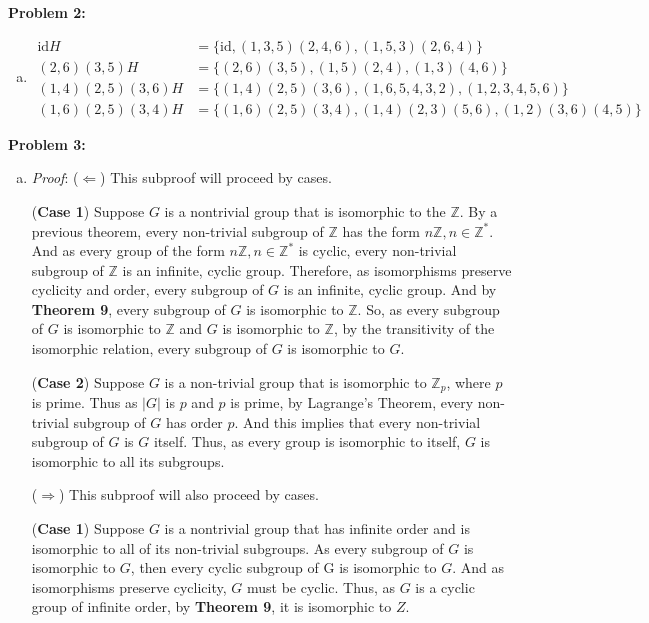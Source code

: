\documentclass[12pt, letterpaper]{article}
\newenvironment{problem}
    [1]
    {\noindent \textbf{Problem #1:}}
    {\vspace{3mm}}
\begin{document}
\begin{problem}{2}
\begin{enumerate}[(a)]
        \item \begin{align*}
            \text{id}H &= \{\text{id}, (1,3,5)(2,4,6), (1,5,3)(2,6,4)\}\\
            (2,6)(3,5)H &= \{(2,6)(3,5), (1,5)(2,4), (1,3)(4,6)\}\\
            (1,4)(2,5)(3,6)H &= \{(1,4)(2,5)(3,6), (1,6,5,4,3,2), (1,2,3,4,5,6)\}\\ 
            (1,6)(2,5)(3,4)H &= \{(1,6)(2,5)(3,4), (1,4)(2,3)(5,6), (1,2)(3,6)(4,5)\}
        \end{align*}
    \end{enumerate}
\end{problem}

\begin{problem}{3}
    \begin{enumerate}[(a)]
        \item \emph{Proof}: ($\Leftarrow$) This subproof will proceed by cases.
        
        \bigskip\noindent
        (\textbf{Case 1}) Suppose
        $G$ is a nontrivial group that is isomorphic to the $\mathbb{Z}$. By a previous theorem,
        every non-trivial subgroup of $\mathbb{Z}$ has the form $n\mathbb{Z}, n \in \mathbb{Z}^*$.
        And as every group of the form $n\mathbb{Z}, n \in \mathbb{Z}^*$ is cyclic, every non-trivial
        subgroup of $\mathbb{Z}$ is an infinite, cyclic group. Therefore, as isomorphisms preserve 
        cyclicity and order, every subgroup of $G$ is an infinite, cyclic group. And by 
        \textbf{Theorem 9}, every subgroup of $G$ is isomorphic to $\mathbb{Z}$. So, as
        every subgroup of $G$ is isomorphic to $\mathbb{Z}$ and $G$ is isomorphic to $\mathbb{Z}$,
        by the transitivity of the isomorphic relation, every subgroup of $G$ is isomorphic to $G$.

        \bigskip\noindent
        (\textbf{Case 2})
        Suppose $G$ is a non-trivial group that is isomorphic to $\mathbb{Z}_p$, where $p$ is prime.
        Thus as $|G|$ is $p$ and $p$ is prime, by Lagrange's Theorem, every non-trivial subgroup of 
        $G$ has order $p$. And this implies that every non-trivial subgroup of $G$ is $G$ itself.
        Thus, as every group is isomorphic to itself, $G$ is isomorphic to all its subgroups. 

        \bigskip\noindent
        ($\Rightarrow$) This subproof will also proceed by cases.

        \bigskip\noindent
        (\textbf{Case 1}) Suppose $G$ is a nontrivial group that has infinite order and is isomorphic
        to all of its non-trivial subgroups. As every subgroup of $G$ is isomorphic to $G$, then
        every cyclic subgroup of G is isomorphic to $G$. And as isomorphisms preserve cyclicity,
        $G$ must be cyclic. Thus, as $G$ is a cyclic group of infinite order, by \textbf{Theorem 9}, 
        it is isomorphic to $Z$.


\end{enumerate}
\end{problem}
\end{document}
